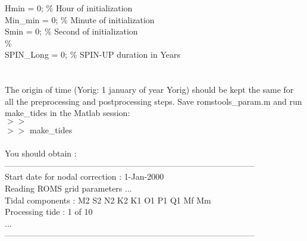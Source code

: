 Hmin          = 0;                  \% Hour of initialization\\
Min\_min       = 0;                  \% Minute of initialization\\
Smin          = 0;                  \% Second of initialization\\
\%\\
SPIN\_Long     = 0;                  \% SPIN-UP duration in Years\\
\\\\
The origin of time (Yorig: 1 january of year Yorig) should be kept the same
for all the preprocessing and postprocessing steps.
Save romstools\_param.m and run make\_tides in the Matlab session:
\\
$>>$\\
$>>$ make\_tides\\\\
You should obtain :\\
------------------------------------------------------------------------------------------\\
Start date for nodal correction : 1-Jan-2000\\
Reading ROMS grid parameters ...\\
Tidal components : M2 S2 N2 K2 K1 O1 P1 Q1 Mf Mm \\
Processing tide : 1 of 10\\
...\\
------------------------------------------------------------------------------------------\\

